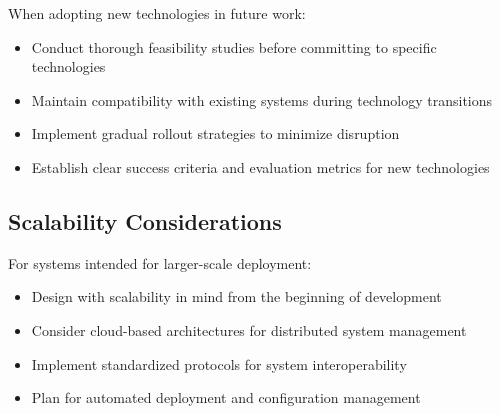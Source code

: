 \documentclass{book}
\begin{document}
\par\noindent When adopting new technologies in future work:

\begin{itemize}
\item Conduct thorough feasibility studies before committing to specific technologies
\item Maintain compatibility with existing systems during technology transitions
\item Implement gradual rollout strategies to minimize disruption
\item Establish clear success criteria and evaluation metrics for new technologies
\end{itemize}

\subsection{Scalability Considerations}

\par\noindent For systems intended for larger-scale deployment:

\begin{itemize}
\item Design with scalability in mind from the beginning of development
\item Consider cloud-based architectures for distributed system management
\item Implement standardized protocols for system interoperability
\item Plan for automated deployment and configuration management
\end{itemize}


\end{document}
